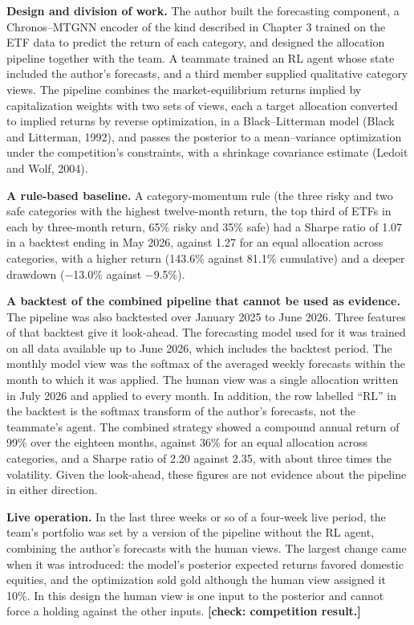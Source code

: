 \documentclass[12pt,a4paper]{report}
\begin{document}
\textbf{Design and division of work.} The author built the forecasting
component, a Chronos--MTGNN encoder of the kind described in Chapter 3
trained on the ETF data to predict the return of each category, and
designed the allocation pipeline together with the team. A teammate
trained an RL agent whose state included the author's forecasts, and a
third member supplied qualitative category views. The pipeline combines
the market-equilibrium returns implied by capitalization weights with
two sets of views, each a target allocation converted to implied returns
by reverse optimization, in a Black--Litterman model (Black and
Litterman, 1992), and passes the posterior to a mean--variance
optimization under the competition's constraints, with a shrinkage
covariance estimate (Ledoit and Wolf, 2004).

\textbf{A rule-based baseline.} A category-momentum rule (the three
risky and two safe categories with the highest twelve-month return, the
top third of ETFs in each by three-month return, 65\% risky and 35\%
safe) had a Sharpe ratio of 1.07 in a backtest ending in May 2026,
against 1.27 for an equal allocation across categories, with a higher
return (143.6\% against 81.1\% cumulative) and a deeper drawdown
(−13.0\% against −9.5\%).

\textbf{A backtest of the combined pipeline that cannot be used as
evidence.} The pipeline was also backtested over January 2025 to June
2026. Three features of that backtest give it look-ahead. The
forecasting model used for it was trained on all data available up to
June 2026, which includes the backtest period. The monthly model view
was the softmax of the averaged weekly forecasts within the month to
which it was applied. The human view was a single allocation written in
July 2026 and applied to every month. In addition, the row labelled
``RL'' in the backtest is the softmax transform of the author's
forecasts, not the teammate's agent. The combined strategy showed a
compound annual return of 99\% over the eighteen months, against 36\%
for an equal allocation across categories, and a Sharpe ratio of 2.20
against 2.35, with about three times the volatility. Given the
look-ahead, these figures are not evidence about the pipeline in either
direction.

\textbf{Live operation.} In the last three weeks or so of a four-week
live period, the team's portfolio was set by a version of the pipeline
without the RL agent, combining the author's forecasts with the human
views. The largest change came when it was introduced: the model's
posterior expected returns favored domestic equities, and the
optimization sold gold although the human view assigned it 10\%. In this
design the human view is one input to the posterior and cannot force a
holding against the other inputs. \textbf{{[}check: competition
result.{]}}
\end{document}
